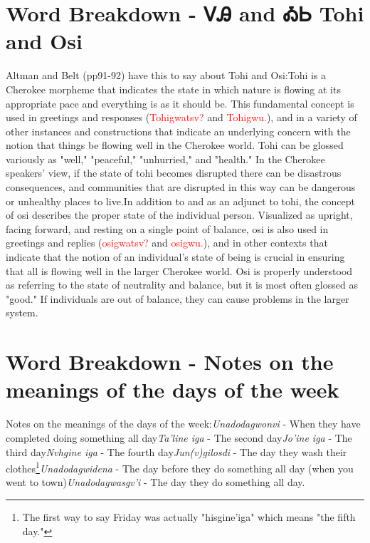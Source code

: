\label{sec:wordBreakdownTohiOsi}\section{Word Breakdown - ᏙᎯ and ᎣᏏ Tohi and Osi}Altman and Belt (pp91-92) have this to say about Tohi and Osi:Tohi is a Cherokee morpheme that indicates the state in which nature is flowing at its appropriate pace and everything is as it should be. This fundamental concept is used in greetings and responses (\textcolor{red}{Tohigwatsv?} and \textcolor{red}{Tohigwu.}), and in a variety of other instances and constructions that indicate an underlying concern with the notion that things be flowing well in the Cherokee world. Tohi can be glossed variously as "well," "peaceful," "unhurried," and "health." In the Cherokee speakers' view, if the state of tohi becomes disrupted there can be disastrous consequences, and communities that are disrupted in this way can be dangerous or unhealthy places to live.In addition to and as an adjunct to tohi, the concept of osi describes the proper state of the individual person. Visualized as upright, facing forward, and resting on a single point of balance, osi is also used in greetings and replies (\textcolor{red}{osigwatsv?} and \textcolor{red}{osigwu.}), and in other contexts that indicate that the notion of an individual’s state of being is crucial in ensuring that all is flowing well in the larger Cherokee world. Osi is properly understood as referring to the state of neutrality and balance, but it is most often glossed as "good." If individuals are out of balance, they can cause problems in the larger system.\cite{altmanBelt90-98}

\label{sec:daysOfWeekMeaning}\section{Word Breakdown - Notes on the meanings of the days of the week}Notes on the meanings of the days of the week:\cite{walc1pp46}\textit{Unadodagwonvi} - When they have completed doing something all day\textit{Ta’line iga} - The second day\textit{Jo’ine iga} - The third day\textit{Nvhgine iga} - The fourth day\textit{Jun(v)gilosdi} - The day they wash their clothes\footnote{The first way to say Friday was actually "hisgine'iga" which means "the fifth day."}\textit{Unadodagwidena} - The day before they do something all day (when you went to town)\textit{Unadodagwasgv’i} - The day they do something all day.